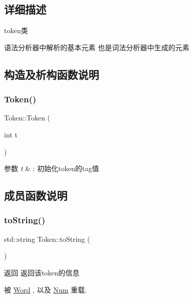 \subsection{详细描述}
token类 

语法分析器中解析的基本元素 也是词法分析器中生成的元素 

\subsection{构造及析构函数说明}
\mbox{\label{class_token_a29580f176bfba9981aeec62946114675}} 
\subsubsection{\texorpdfstring{Token()}{Token()}}
{\footnotesize\ttfamily Token\+::\+Token (\begin{DoxyParamCaption}\item[{int}]{t }\end{DoxyParamCaption})}


\begin{DoxyParams}{参数}
{\em t} & \+: 初始化token的tag值 \\
\hline
\end{DoxyParams}


\subsection{成员函数说明}
\mbox{\label{class_token_a8863381edabce7bc1e92473b445ba81f}} 
\subsubsection{\texorpdfstring{to\+String()}{toString()}}
{\footnotesize\ttfamily std\+::string Token\+::to\+String (\begin{DoxyParamCaption}{ }\end{DoxyParamCaption})\hspace{0.3cm}{\ttfamily [virtual]}}

\begin{DoxyReturn}{返回}
返回该token的信息 
\end{DoxyReturn}


被 \hyperlink{class_word_a950a81bfd0fc369b0eb8d0d6b27e2870}{Word} , 以及 \hyperlink{class_num_aec8ab507b42f2080a8cc197f45f0c935}{Num} 重载.



